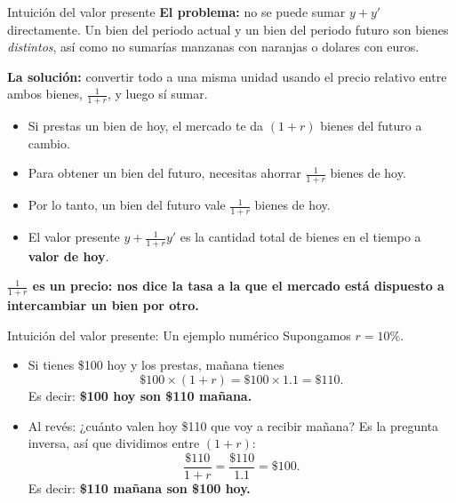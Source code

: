 \documentclass[aspectratio=169,11pt]{beamer}
\newcommand{\cidehighlight}[1]{\textcolor{CIDEBlue}{\bfseries #1}}
\newcommand{\notafuentes}[1]{\note{[Sources] #1}}
\begin{document}
\begin{frame}{Intuición del valor presente}
\hypertarget{app:VP}{} 
\small
  \textbf{El problema:} no se puede sumar \(y + y'\) directamente. Un bien del periodo actual y un bien del periodo futuro son bienes \textit{distintos}, así como no sumarías manzanas con naranjas o dolares con euros.

  \vspace{0.4em}
  \textbf{La solución:} convertir todo a una misma unidad usando el precio relativo entre ambos bienes, \(\frac{1}{1+r}\), y luego sí sumar.

  \vspace{0.5em}
  \begin{itemize}
    \item Si prestas un bien de hoy, el mercado te da \((1+r)\) bienes del futuro a cambio.
    \item Para obtener un bien del futuro, necesitas ahorrar \(\frac{1}{1+r}\) bienes de hoy.
    \item Por lo tanto, un bien del futuro vale \(\frac{1}{1+r}\) bienes de hoy.
    \item El valor presente \(y + \frac{1}{1+r}y'\) es la cantidad total de bienes en el tiempo a \textbf{valor de hoy}.
  \end{itemize}
  \vspace{0.4em}
  \cidehighlight{\(\frac{1}{1+r}\) es un \textbf{precio}: nos dice la tasa a la que el mercado está dispuesto a intercambiar un bien por otro.}


  \hyperlink{RP}{}
\end{frame}

\begin{frame}{Intuición del valor presente: Un ejemplo numérico}
  Supongamos \(r = 10\%\).

  \vspace{0.4em}
  \begin{itemize}
    \setlength{\itemsep}{0.6em}
    \item Si tienes \$100 hoy y los prestas, mañana tienes
      \[
        \$100 \times (1+r) = \$100 \times 1.1 = \$110.
      \]
      Es decir: \textbf{\$100 hoy son \$110 mañana.}
    \item Al revés: ¿cuánto valen hoy \$110 que voy a recibir mañana? Es la
      pregunta inversa, así que dividimos entre \((1+r)\):
      \[
        \frac{\$110}{1+r} = \frac{\$110}{1.1} = \$100.
      \]
      Es decir: \textbf{\$110 mañana son \$100 hoy.}
  \end{itemize}

  \notafuentes{Kurlat (2020), sección 6.2.}
  \hyperlink{RP}{}
\end{frame}
\end{document}
